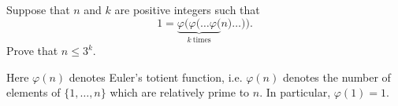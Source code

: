 Suppose that $n$ and $k$ are positive integers such that \[ 1 = \underbrace{\varphi( \varphi( \dots \varphi(}_{k\ \text{times}} n) \dots )). \] Prove that $n \le 3^k$.

Here $\varphi(n)$ denotes Euler's totient function, i.e. $\varphi(n)$ denotes the number of elements of $\{1, \dots, n\}$ which are relatively prime to $n$. In particular, $\varphi(1) = 1$.